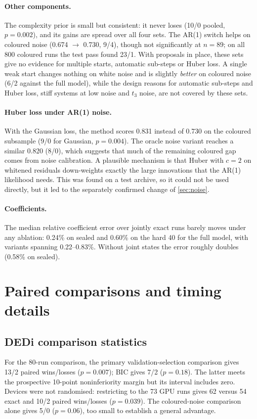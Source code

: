 \paragraph{Other components.} The complexity prior is small but consistent: it never loses (10/0 pooled, $p=0.002$), and its gains are spread over all four sets. The AR(1) switch helps on coloured noise (0.674 $\to$ 0.730, 9/4), though not significantly at $n=89$; on all 800 coloured runs the test pass found 23/1. With proposals in place, these sets give no evidence for multiple starts, automatic sub-steps or Huber loss. A single weak start changes nothing on white noise and is slightly \emph{better} on coloured noise (6/2 against the full model), while the design reasons for automatic sub-steps and Huber loss, stiff systems at low noise and $t_3$ noise, are not covered by these sets.

\paragraph{Huber loss under AR(1) noise.} With the Gaussian loss, the method scores 0.831 instead of 0.730 on the coloured subsample (9/0 for Gaussian, $p=0.004$). The oracle noise variant reaches a similar 0.820 (8/0), which suggests that much of the remaining coloured gap comes from noise calibration. A plausible mechanism is that Huber with $c=2$ on whitened residuals down-weights exactly the large innovations that the AR(1) likelihood needs. This was found on a test archive, so it could not be used directly, but it led to the separately confirmed change of \cref{sec:noise}.

\paragraph{Coefficients.} The median relative coefficient error over jointly exact runs barely moves under any ablation: 0.24\% on sealed and 0.60\% on the hard 40 for the full model, with variants spanning 0.22--0.83\%. Without joint states the error roughly doubles (0.58\% on sealed).

\section{Paired comparisons and timing details}
\subsection{DEDi comparison statistics}\label{app:paired}
For the 80-run comparison, the primary validation-selection comparison gives 13/2 paired wins/losses ($p=0.007$); BIC gives 7/2 ($p=0.18$). The latter meets the prospective 10-point noninferiority margin but its interval includes zero. Devices were not randomised: restricting to the 73 GPU runs gives 62 versus 54 exact and 10/2 paired wins/losses ($p=0.039$). The coloured-noise comparison alone gives 5/0 ($p=0.06$), too small to establish a general advantage.

